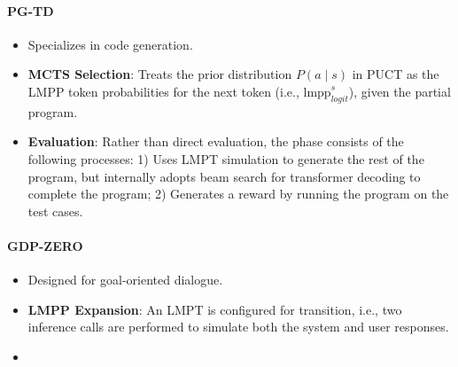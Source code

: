 \paragraph{PG-TD \citep{zhang2023planning}}
\begin{itemize}
    \item Specializes in code generation.
    \item \textbf{MCTS Selection}: Treats the prior distribution \(P(a \mid s)\) in PUCT as the LMPP token probabilities for the next token (i.e., $\text{lmpp}^s_{logit}$), given the partial program.
    
    \item \textbf{Evaluation}: Rather than direct evaluation, the phase consists of the following processes: 1) Uses LMPT simulation to generate the rest of the program, but internally adopts beam search for transformer decoding to complete the program; 2) Generates a reward by running the program on the test cases.
\end{itemize}

\paragraph{GDP-ZERO \citep{yu2023promptbased}}
\begin{itemize}
    \item Designed for goal-oriented dialogue.
    
    \item \textbf{LMPP Expansion}: An LMPT is configured for transition, i.e.,  two inference calls are performed to simulate both the system and user responses. 

    \item {}
\end{itemize}

